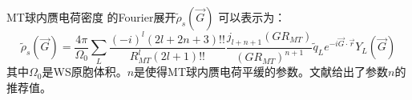 
MT球内赝电荷密度%
的Fourier展开$\tilde\rho_s(\vec G)$%
可以表示为\cite{JMP22-2433_1981}：
\begin{equation}
  \tilde\rho_s(\vec G)=\frac{4\pi}{\Omega_0}\sum_L\dfrac{(-i)^l(2l+2n+3)!!}{R_{MT}^l(2l+1)!!}\dfrac{j_{l+n+1}(GR_{MT})}{(GR_{MT})^{n+1}}\tilde q_Le^{-i\vec G\cdot\vec r}Y_L(\vec G)
  \label{eq:solid-76}
\end{equation}
其中$\Omega_0$是WS原胞体积。$n$是使得MT球内赝电荷平缓的参数。文献\cite{JMP22-2433_1981}给出了参数$n$的推荐值。

